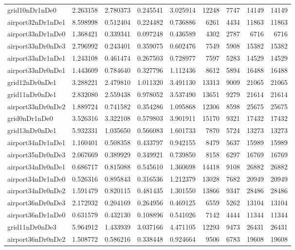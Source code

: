 \begin{longtable}{|l|r|r|r|r|r|r|r|r|}
grid10nDr1nDe0 & 2.263158 & 2.780373 & 0.245541 & 3.025914 & 12248 & 7747 & 14149 & 14149 \\
airport32nDr1nDe1 & 8.598998 & 0.512404 & 0.224482 & 0.736886 & 6261 & 4434 & 11863 & 11863 \\
airport33nDr1nDe0 & 1.368421 & 0.339341 & 0.097248 & 0.436589 & 4302 & 2787 & 6716 & 6716 \\
airport33nDr0nDe3 & 2.796992 & 0.243401 & 0.359075 & 0.602476 & 7549 & 5908 & 15382 & 15382 \\
airport33nDr1nDe1 & 1.243108 & 0.461474 & 0.267503 & 0.728977 & 7597 & 5283 & 14529 & 14529 \\
airport33nDr0nDe1 & 1.443609 & 0.784640 & 0.327796 & 1.112436 & 8612 & 5894 & 16488 & 16488 \\
grid12nDr0nDe1 & 3.288221 & 2.479810 & 1.011320 & 3.491130 & 13313 & 9009 & 21065 & 21065 \\
grid11nDr0nDe1 & 2.832080 & 2.559438 & 0.978052 & 3.537490 & 13651 & 9279 & 21614 & 21614 \\
airport33nDr0nDe2 & 1.889724 & 0.741582 & 0.354286 & 1.095868 & 12306 & 8598 & 25675 & 25675 \\
grid0nDr1nDe0 & 3.526316 & 3.322108 & 0.579803 & 3.901911 & 15170 & 9321 & 17432 & 17432 \\
grid13nDr0nDe1 & 5.932331 & 1.035650 & 0.566083 & 1.601733 & 7870 & 5724 & 13273 & 13273 \\
airport34nDr1nDe1 & 1.160401 & 0.508358 & 0.433797 & 0.942155 & 8479 & 5637 & 15989 & 15989 \\
airport35nDr0nDe3 & 2.067669 & 0.389929 & 0.349921 & 0.739850 & 8158 & 6297 & 16769 & 16769 \\
airport34nDr0nDe1 & 0.686717 & 0.815088 & 0.545610 & 1.360698 & 14418 & 9108 & 26882 & 26882 \\
airport34nDr1nDe0 & 0.526316 & 0.895843 & 0.316536 & 1.212379 & 13028 & 7682 & 20949 & 20949 \\
airport34nDr0nDe2 & 1.591479 & 0.820115 & 0.481435 & 1.301550 & 13866 & 9347 & 28486 & 28486 \\
airport36nDr0nDe3 & 2.172932 & 0.204169 & 0.264956 & 0.469125 & 6559 & 5262 & 13104 & 13104 \\
airport36nDr1nDe0 & 0.631579 & 0.432130 & 0.108896 & 0.541026 & 7142 & 4444 & 11344 & 11344 \\
grid11nDr0nDe3 & 5.964912 & 1.433939 & 3.037166 & 4.471105 & 12293 & 9473 & 26431 & 26431 \\
airport36nDr0nDe2 & 1.508772 & 0.586216 & 0.338448 & 0.924664 & 9506 & 6783 & 19608 & 19608 \\

\end{longtable}
